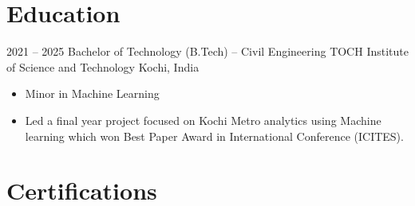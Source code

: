 \documentclass[10pt, a4paper, sans]{moderncv}
\begin{document}
\section{Education}

\cventry
  {2021 -- 2025}
  {Bachelor of Technology (B.Tech) -- Civil Engineering}
  {TOCH Institute of Science and Technology}
  {Kochi, India}
  {}
  {
  \begin{itemize}\setlength{\itemsep}{2pt}
    \item Minor in Machine Learning
    \item Led a final year project focused on Kochi Metro analytics using Machine learning which won Best Paper Award in International Conference (ICITES).
  \end{itemize}
  }

\section{Certifications}

\end{document}
